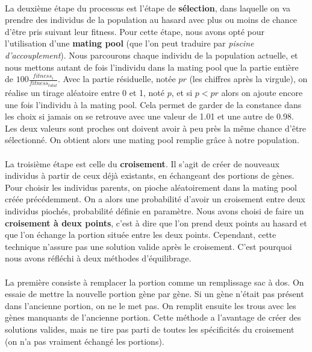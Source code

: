 \documentclass[12pt]{article}
\begin{document}
\paragraph{}La deuxième étape du processus est l'étape de \textbf{sélection}, dans laquelle on va prendre des individus de la population au hasard avec plus ou moins de chance d'être pris suivant leur fitness. Pour cette étape, nous avons opté pour l'utilisation d'une \textbf{mating pool} (que l'on peut traduire par \textit{piscine d'accouplement}). Nous parcourons chaque individu de la population actuelle, et nous mettons autant de fois l'individu dans la mating pool que la partie entière de $100\frac{fitness_i}{fitness_{total}}$. Avec la partie résiduelle, notée $pr$ (les chiffres après la virgule), on réalise un tirage aléatoire entre 0 et 1, noté $p$, et si $p < pr$ alors on ajoute encore une fois l'individu à la mating pool. Cela permet de garder de la constance dans les choix si jamais on se retrouve avec une valeur de 1.01 et une autre de 0.98. Les deux valeurs sont proches ont doivent avoir à peu près la même chance d'être sélectionné. On obtient alors une mating pool remplie grâce à notre population.

\paragraph{}La troisième étape est celle du \textbf{croisement}. Il s'agit de créer de nouveaux individus à partir de ceux déjà existants, en échangeant des portions de gènes. Pour choisir les individus parents, on pioche aléatoirement dans la mating pool créée précédemment. On a alors une probabilité d'avoir un croisement entre deux individus piochés, probabilité définie en paramètre. Nous avons choisi de faire un \textbf{croisement à deux points}, c'est à dire que l'on prend deux points au hasard et que l'on échange la portion située entre les deux points. Cependant, cette technique n'assure pas une solution valide après le croisement. C'est pourquoi nous avons réfléchi à deux méthodes d'équilibrage.
\paragraph{}La première consiste à remplacer la portion comme un remplissage sac à dos. On essaie de mettre la nouvelle portion gène par gène. Si un gène n'était pas présent dans l'ancienne portion, on ne le met pas. On remplit ensuite les trous avec les gènes manquants de l'ancienne portion. Cette méthode a l'avantage de créer des solutions valides, mais ne tire pas parti de toutes les spécificités du croisement (on n'a pas vraiment échangé les portions).
\end{document}
